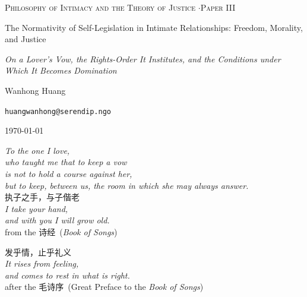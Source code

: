 \documentclass[11pt,a4paper]{article}
\begin{document}
\thispagestyle{empty}
\null\vfill
\begin{center}
{\footnotesize\color{rosedeep}\scshape Philosophy of Intimacy and the Theory of Justice \quad$\cdot$\quad Paper III\par}
\vspace{0.9em}
\coverrule\par
\vspace{1.6em}
{\color{warnred}\Large The Normativity of Self-Legislation in Intimate Relationships: Freedom, Morality, and Justice\par}
\vspace{1.0em}
{\color{warnred}\large\itshape On a Lover's Vow, the Rights-Order It Institutes, and the Conditions under Which It Becomes Domination\par}
\vspace{2.4em}
\coverrule[0.25]\par
\vspace{1.4em}
{\large Wanhong Huang\par}
\vspace{0.5em}
{\footnotesize \texttt{huangwanhong@serendip.ngo}\par}
\vspace{1.2em}
{\today\par}
\end{center}
\vfill\null
\coverfootnote
\clearpage

\clearpage
\thispagestyle{empty}
\vspace*{0.20\textheight}
\begin{center}
{\itshape\color{ink}
To the one I love,\\[0.4em]
who taught me that to keep a vow\\[0.25em]
is not to hold a course against her,\\[0.25em]
but to keep, between us, the room in which she may always answer.\\}
\vspace{2.6em}
{\cjkfont\large\color{rosedeep} 执子之手，与子偕老}\\[0.8em]
{\itshape\small\color{rosedeep}
I take your hand,\\[0.18em]
and with you I will grow old.}\\[1.0em]
{\footnotesize\color{lightgold}from the \cjkfont 诗经\/{\normalfont\ (\textit{Book of Songs})}}
\vspace{2.4em}

{\cjkfont\large\color{rosedeep} 发乎情，止乎礼义}\\[0.8em]
{\itshape\small\color{rosedeep}
It rises from feeling,\\[0.18em]
and comes to rest in what is right.}\\[1.0em]
{\footnotesize\color{lightgold}after the \cjkfont 毛诗序\/{\normalfont\ (Great Preface to the \textit{Book of Songs})}}
\end{center}
\vfill
\clearpage
\end{document}
